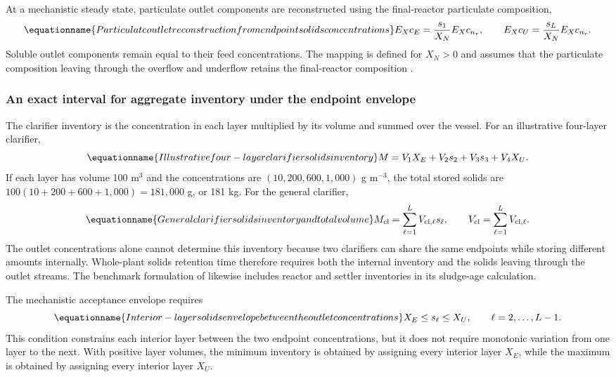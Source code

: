 At a mechanistic steady state, particulate outlet components are reconstructed using the final-reactor particulate composition,
\begin{equation}
\equationname{Particulate outlet reconstruction from endpoint solids concentrations}
E_Xc_E=\frac{s_1}{X_N}E_Xc_{n_r},\qquad
E_Xc_U=\frac{s_L}{X_N}E_Xc_{n_r}.
\label{eq:plant_outlet_reconstruction}
\end{equation}
Soluble outlet components remain equal to their feed concentrations. The mapping is defined for $X_N>0$ and assumes that the particulate composition leaving through the overflow and underflow retains the final-reactor composition \citep{JeppssonDiehl1996}.

\subsubsection{An exact interval for aggregate inventory under the endpoint envelope}

The clarifier inventory is the concentration in each layer multiplied by its volume and summed over the vessel. For an illustrative four-layer clarifier,
\begin{equation}
\equationname{Illustrative four-layer clarifier solids inventory}
M=V_1X_E+V_2s_2+V_3s_3+V_4X_U.
\end{equation}
If each layer has volume 100 m$^3$ and the concentrations are $(10,200,600,1{,}000)$ g m$^{-3}$, the total stored solids are $100(10+200+600+1{,}000)=181{,}000$ g, or 181 kg. For the general clarifier,
\begin{equation}
\equationname{General clarifier solids inventory and total volume}
M_{\rm cl}=\sum_{\ell=1}^{L}V_{{\rm cl},\ell}s_\ell,\qquad
V_{\rm cl}=\sum_{\ell=1}^{L}V_{{\rm cl},\ell}.
\label{eq:plant_inventory_definition}
\end{equation}
The outlet concentrations alone cannot determine this inventory because two clarifiers can share the same endpoints while storing different amounts internally. Whole-plant solids retention time therefore requires both the internal inventory and the solids leaving through the outlet streams. The benchmark formulation of \citet{Alex2008} likewise includes reactor and settler inventories in its sludge-age calculation.

The mechanistic acceptance envelope requires
\begin{equation}
\equationname{Interior-layer solids envelope between the outlet concentrations}
X_E\le s_\ell\le X_U,\qquad \ell=2,\ldots,L-1.
\label{eq:plant_layer_envelope}
\end{equation}
This condition constrains each interior layer between the two endpoint concentrations, but it does not require monotonic variation from one layer to the next. With positive layer volumes, the minimum inventory is obtained by assigning every interior layer $X_E$, while the maximum is obtained by assigning every interior layer $X_U$.

